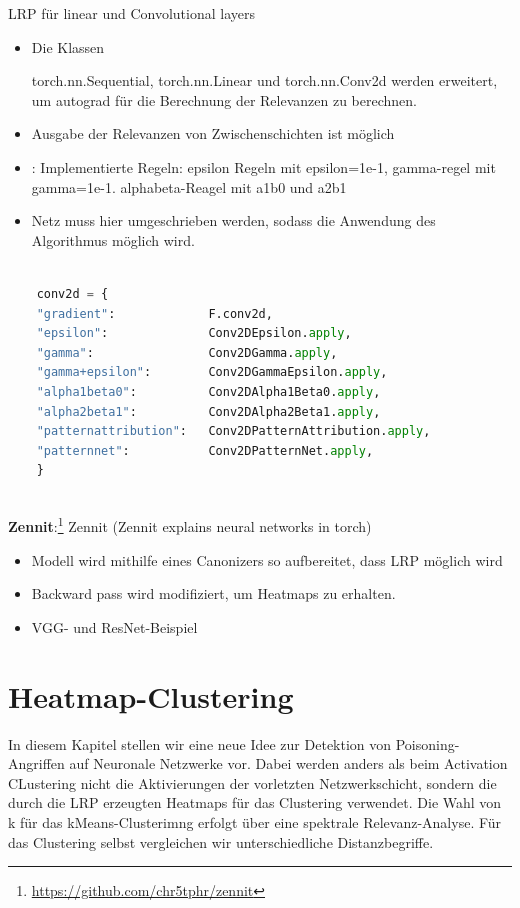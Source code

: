 \documentclass[11pt,a4paper]{article}
\numberwithin{equation}{section}
\begin{document}
	
	
	\noindent LRP für linear und Convolutional layers
	
	\begin{itemize}
		\item Die Klassen
		
		torch.nn.Sequential, torch.nn.Linear und torch.nn.Conv2d werden erweitert, um autograd für die Berechnung der Relevanzen zu berechnen.
		
		\item Ausgabe der Relevanzen von Zwischenschichten ist möglich
		\item: Implementierte Regeln: epsilon Regeln mit epsilon=1e-1, gamma-regel mit gamma=1e-1. alphabeta-Reagel mit a1b0 und a2b1
		\item Netz muss hier umgeschrieben werden, sodass die Anwendung des Algorithmus möglich wird.
	\end{itemize}
	
	\begin{lstlisting}[language=Python, caption=Implementierte Regeln fhvilshoj]
	
	conv2d = {
	"gradient":             F.conv2d,
	"epsilon":              Conv2DEpsilon.apply,
	"gamma":                Conv2DGamma.apply,
	"gamma+epsilon":        Conv2DGammaEpsilon.apply,
	"alpha1beta0":          Conv2DAlpha1Beta0.apply,
	"alpha2beta1":          Conv2DAlpha2Beta1.apply,
	"patternattribution":   Conv2DPatternAttribution.apply,
	"patternnet":           Conv2DPatternNet.apply,
	}
	
	\end{lstlisting}
	
	\noindent \textbf{Zennit}:\footnote{\url{https://github.com/chr5tphr/zennit}}
	Zennit (Zennit explains neural networks in torch) 
	\begin{itemize}
		\item Modell wird mithilfe eines Canonizers so aufbereitet, dass LRP möglich wird
		\item Backward pass wird modifiziert, um Heatmaps zu erhalten.
		\item VGG- und ResNet-Beispiel
	\end{itemize}
	\section{Heatmap-Clustering} 
	In diesem Kapitel stellen wir eine neue Idee zur Detektion von Poisoning-Angriffen auf Neuronale Netzwerke vor. Dabei werden anders als beim Activation CLustering nicht die Aktivierungen der vorletzten Netzwerkschicht, sondern die durch die LRP erzeugten Heatmaps für das Clustering verwendet. Die Wahl von k für das kMeans-Clusterimng erfolgt über eine spektrale Relevanz-Analyse. Für das Clustering selbst vergleichen wir unterschiedliche Distanzbegriffe.
	
\end{document}
